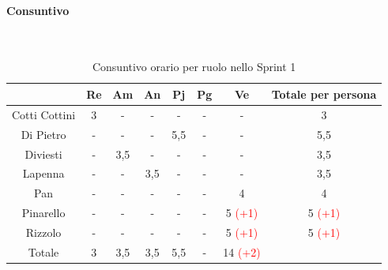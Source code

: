 \documentclass{article}
\begin{document}
                \paragraph{Consuntivo}\mbox{}\\
                \begin{table}[H]
                    \centering
                    \begin{tabular}{|c|c|c|c|c|c|c|c|}
                        \hline
                                      & Re  & Am  & An  & Pj  & Pg  & Ve  & Totale per persona \\ \hline
                        Cotti Cottini & 3   & -   & -   & -   & -   & -   & 3                  \\ \hline
                        Di Pietro     & -   & -   & -   & 5,5 & -   & -   & 5,5                \\ \hline
                        Diviesti      & -   & 3,5 & -   & -   & -   & -   & 3,5                \\ \hline
                        Lapenna       & -   & -   & 3,5 & -   & -   & -   & 3,5                \\ \hline
                        Pan           & -   & -   & -   & -   & -  & 4   & 4                 \\ \hline
                        Pinarello     & -   & -   & -   & -   & -   & 5 \textcolor{red}{(+1)}  & 5 \textcolor{red}{(+1)}                 \\ \hline
                        Rizzolo       & -   & -   & -   & -   & -   & 5 \textcolor{red}{(+1)}  & 5 \textcolor{red}{(+1)}                 \\ \hline
                        Totale        & 3   & 3,5 & 3,5 & 5,5 & -  & 14 \textcolor{red}{(+2)} &                    \\ \hline
                        \end{tabular}
                    \caption{Consuntivo orario per ruolo nello Sprint 1}
                \end{table}

\end{document}
